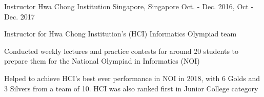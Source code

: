 \begin{cventries}

  \cventry
    {Instructor} %
    {Hwa Chong Institution} %
    {Singapore, Singapore} %
    {Oct. - Dec. 2016, Oct - Dec. 2017} %
    {
      \begin{cvitems} %
      \item { Instructor for Hwa Chong Institution’s (HCI) Informatics Olympiad team}
      \item { Conducted weekly lectures and practice contests for around 20 students to prepare them for the National Olympiad in Informatics (NOI)}
      \item { Helped to achieve HCI's best ever performance in NOI in 2018, with 6 Golds and 3 Silvers from a team of 10. HCI was also ranked first in Junior College category}
      \end{cvitems}
    }

\end{cventries}
